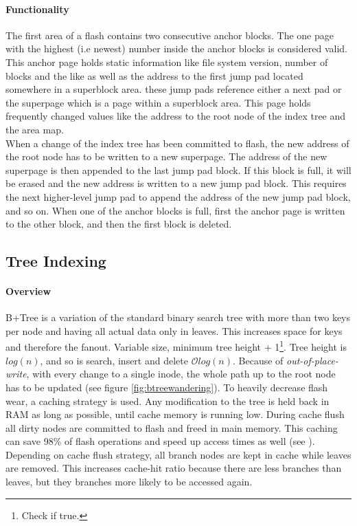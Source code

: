 \paragraph{Functionality}
The first area of a flash contains two consecutive anchor blocks. The one page with the highest (i.e newest) number inside the anchor blocks is considered valid. This anchor page holds static information like file system version, number of blocks and the like as well as the address to the first jump pad located somewhere in a superblock area. these jump pads reference either a next pad or the superpage which is a page within a superblock area. This page holds frequently changed values like the address to the root node of the index tree and the area map.\\

When a change of the index tree has been committed to flash, the new address of the root node has to be written to a new superpage. The address of the new superpage is then appended to the last jump pad block. If this block is full, it will be erased and the new address is written to a new jump pad block. This requires the next higher-level jump pad to append the address of the new jump pad block, and so on. When one of the anchor blocks is full, first the anchor page is written to the other block, and then the first block is deleted.\\



\subsection{Tree Indexing}
\label{b+tree}
\paragraph{Overview}
B+Tree is a variation of the standard binary search tree with more than two keys per node and having all actual data only in leaves. This increases space for keys and therefore the fanout. Variable size, minimum tree height + 1\footnote{Check if true.}. Tree height is $log(n)$, and so is search, insert and delete $\mathcal{O}log(n)$. Because of \textit{out-of-place-write}, with every change to a single inode, the whole path up to the root node has to be updated (see figure \ref{fig:btreewandering}). To heavily decrease flash wear, a caching strategy is used. Any modification to the tree is held back in RAM as long as possible, until cache memory is running low. During cache flush all dirty nodes are committed to flash and freed in main memory. This caching can save 98\% of flash operations and speed up access times as well (see ). Depending on cache flush strategy, all branch nodes are kept in cache while leaves are removed. This increases cache-hit ratio because there are less branches than leaves, but they branches more likely to be accessed again.

